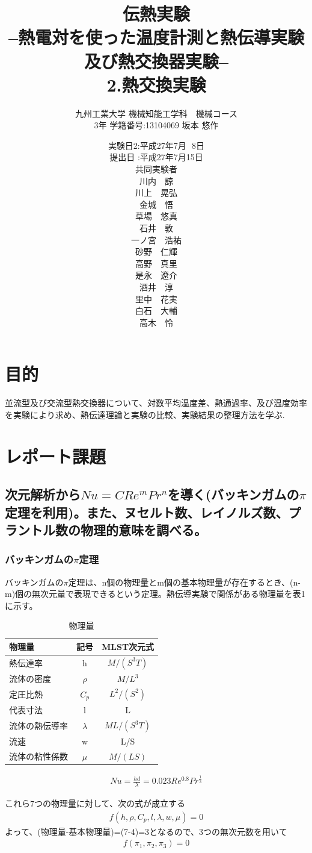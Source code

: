 \documentclass[a4j,twoside,openright,11pt]{jarticle}
\title{伝熱実験\\--熱電対を使った温度計測と熱伝導実験及び熱交換器実験--\\2.熱交換実験}
\author{九州工業大学 機械知能工学科　機械コース\\3年 学籍番号:13104069 坂本 悠作}
\date{
実験日2:平成27年7月\,\,\,\,8日\\
提出日 :平成27年7月15日\\
共同実験者\\
川内　諒\\
川上　晃弘\\
金城　悟\\
草場　悠真\\
石井　敦\\
一ノ宮　浩祐\\
砂野　仁輝\\
高野　真里\\
是永　遼介\\
酒井　淳\\
里中　花実\\
白石　大輔\\
高木　怜\\
}
\begin{document}
\maketitle
\newpage

\section{目的}
並流型及び交流型熱交換器について、対数平均温度差、熱通過率、及び温度効率を実験により求め、熱伝達理論と実験の比較、実験結果の整理方法を学ぶ.
\section{レポート課題}
\subsection{次元解析から$Nu=CRe^mPr^n$を導く(バッキンガムの$\pi$定理を利用)。また、ヌセルト数、レイノルズ数、プラントル数の物理的意味を調べる。}
\subsubsection{バッキンガムの$\pi$定理}
バッキンガムの$\pi$定理は、n個の物理量とm個の基本物理量が存在するとき、(n-m)個の無次元量で表現できるという定理。熱伝導実験で関係がある物理量を表1に示す。
\begin{table}[htb]
\begin{center}
  \caption{物理量}
  \begin{tabular}{lcc} \hline
物理量&記号&MLST次元式\\\hline
熱伝達率&h&$M/(S^3T)$\\
流体の密度&$\rho$&$M/L^3$\\
定圧比熱&$C_p$&$L^2/(S^2)$\\
代表寸法&l&L\\
流体の熱伝導率&$\lambda$&$ML/(S^3T)$\\
流速&w&L/S\\
流体の粘性係数&$\mu$&$M/(LS)$\\
\hline
  \end{tabular}
\end{center}
\end{table}
\begin{eqnarray}
Nu = \frac{hd}{\lambda} =0.023Re^{0.8}Pr^{\frac{1}{3}}
\end{eqnarray}

これら7つの物理量に対して、次の式が成立する
\begin{eqnarray}
f(h,\rho,C_p,l,\lambda,w,\mu) = 0
\end{eqnarray}
よって、(物理量-基本物理量)=(7-4)=3となるので、3つの無次元数を用いて
\begin{eqnarray}
f(\pi_1,\pi_2,\pi_3) = 0
\end{eqnarray}
\end{document}
